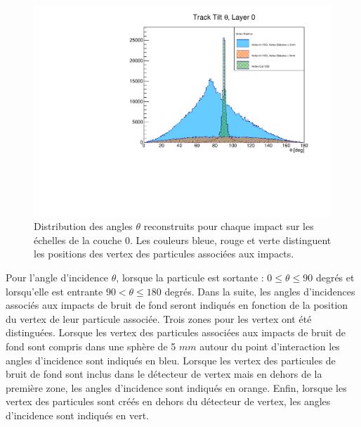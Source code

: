   \begin{figure}[!htb]
    \centering
    \includegraphics[scale=0.60]{./figures/Track_Tilts_Beamstrahlung/beamstrahlung_Theta/Track_Tilts_Theta_Layer0.pdf}
    \caption{Distribution des angles $\theta$ reconstruits pour chaque impact sur les \'echelles de la couche 0. Les couleurs bleue, rouge et verte distinguent les positions des vertex des particules associ\'ees aux impacts.}
    \label{fig:theta_Layer0}
  \end{figure}
  
  
  Pour l'angle d'incidence $\theta$, lorsque la particule est sortante : $0 \leq \theta \leq 90$ degr\'es et lorsqu'elle est entrante $90 < \theta \leq 180$ degr\'es. Dans la suite, les angles d'incidences associ\'es aux impacts de bruit de fond seront indiqu\'es en fonction de la position du vertex de leur particule associ\'ee. Trois zones pour les vertex ont \'et\'e distingu\'ees. Lorsque les vertex des particules associ\'ees aux impacts de bruit de fond sont compris dans une sph\`ere de 5 $mm$ autour du point d'interaction les angles d'incidence sont indiqu\'es en bleu. Lorsque les vertex des particules de bruit de fond sont inclus dans le d\'etecteur de vertex mais en dehors de la premi\`ere zone, les angles d'incidence sont indiqu\'es en orange. Enfin, lorsque les vertex des particules sont cr\'e\'es en dehors du d\'etecteur de vertex, les angles d'incidence sont indiqu\'es en vert.
  
  \medskip
  
